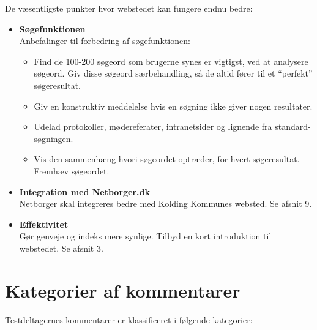 \documentclass[10pt,a4paper]{article}      %
\begin{document}
\noindent De væsentligste punkter hvor webstedet kan fungere endnu bedre:
\begin{itemize}
  \item \textbf{Søgefunktionen}\\
  Anbefalinger til forbedring af søgefunktionen:
  \begin{itemize}
    \item Find de 100-200 søgeord som brugerne synes er vigtigst, ved at analysere søgeord. Giv disse søgeord særbehandling, så de altid fører til et ``perfekt'' søgeresultat.
    \item Giv en konstruktiv meddelelse hvis en søgning ikke giver nogen resultater.
    \item Udelad protokoller, mødereferater, intranetsider og lignende fra standard-søgningen.
    \item Vis den sammenhæng hvori søgeordet optræder, for hvert søgeresultat. Fremhæv søgeordet.
  \end{itemize}
  \item \textbf{Integration med Netborger.dk}\\
  Netborger skal integreres bedre med Kolding Kommunes websted. Se afsnit 9.
  \item \textbf{Effektivitet}\\
  Gør genveje og indeks mere synlige. Tilbyd en kort introduktion til webstedet. Se afsnit 3.
\end{itemize}

\clearpage

\tableofcontents
\clearpage


\section{Kategorier af kommentarer}
Testdeltagernes kommentarer er klassificeret i følgende kategorier:
\end{document}
